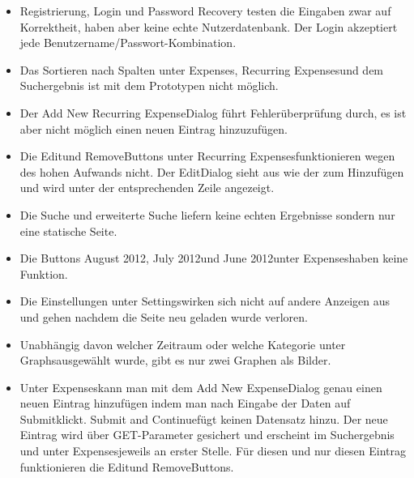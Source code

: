 \documentclass[a4paper,10pt]{article}
\begin{document}
\begin{itemize}
    \item Registrierung, Login und Password Recovery testen die Eingaben zwar auf
            Korrektheit, haben aber keine echte Nutzerdatenbank. Der Login akzeptiert
            jede Benutzername/Passwort-Kombination.
    \item Das Sortieren nach Spalten unter \glqq Expenses\grqq, \glqq
            Recurring Expenses\grqq\space und dem Suchergebnis ist mit dem Prototypen
            nicht m\"oglich.
    \item Der \glqq Add New Recurring Expense\grqq\space Dialog führt
            Fehler\"uberprüfung durch, es ist aber nicht m\"oglich einen neuen
            Eintrag hinzuzuf\"ugen.
    \item Die \glqq Edit\grqq\space und \glqq Remove\grqq\space Buttons unter \glqq
            Recurring Expenses\grqq\space funktionieren wegen des hohen Aufwands
            nicht. Der \glqq Edit\grqq\space Dialog sieht aus wie der zum
            Hinzuf\"ugen und wird unter der entsprechenden Zeile angezeigt.
    \item Die Suche und erweiterte Suche liefern keine echten Ergebnisse sondern nur
            eine statische Seite.
    \item Die Buttons \glqq August 2012\grqq, \glqq July 2012\grqq\space und \glqq
            June 2012\grqq\space unter \glqq Expenses\grqq\space haben keine
            Funktion.
    \item Die Einstellungen unter \glqq Settings\grqq\space wirken sich nicht auf
            andere Anzeigen aus und gehen nachdem die Seite neu geladen wurde
            verloren.
    \item Unabh\"angig davon welcher Zeitraum oder welche Kategorie unter \glqq
            Graphs\grqq\space ausgew\"ahlt wurde, gibt es nur zwei Graphen als
            Bilder.
    \item Unter \glqq Expenses\grqq\space kann man mit dem \glqq Add New
            Expense\grqq\space Dialog genau einen neuen Eintrag hinzuf\"ugen indem
            man nach Eingabe der Daten auf \glqq Submit\grqq\space klickt. \glqq
            Submit and Continue\grqq\space f\"ugt keinen Datensatz hinzu. Der neue
            Eintrag wird \"uber GET-Parameter gesichert und erscheint im Suchergebnis
            und unter \glqq Expenses\grqq\space jeweils an erster Stelle. F\"ur
            diesen und nur diesen Eintrag funktionieren die \glqq Edit\grqq\space und
            \glqq Remove\grqq\space Buttons.

\end{itemize}
\end{document}
